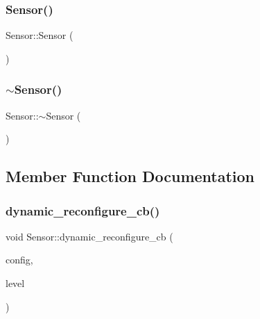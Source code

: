 \subsubsection{\texorpdfstring{Sensor()}{Sensor()}\hspace{0.1cm}{\footnotesize\ttfamily [2/2]}}
{\footnotesize\ttfamily Sensor\+::\+Sensor (\begin{DoxyParamCaption}{ }\end{DoxyParamCaption})}

\mbox{\label{classSensor_aee8c70e7ef05ce65e7ee33686b5d7db2}} 
\subsubsection{\texorpdfstring{$\sim$\+Sensor()}{~Sensor()}\hspace{0.1cm}{\footnotesize\ttfamily [2/2]}}
{\footnotesize\ttfamily Sensor\+::$\sim$\+Sensor (\begin{DoxyParamCaption}{ }\end{DoxyParamCaption})}



\subsection{Member Function Documentation}
\mbox{\label{classSensor_aa95e03d6992d49345dca8c16129dc3c6}} 
\subsubsection{\texorpdfstring{dynamic\+\_\+reconfigure\+\_\+cb()}{dynamic\_reconfigure\_cb()}\hspace{0.1cm}{\footnotesize\ttfamily [1/2]}}
{\footnotesize\ttfamily void Sensor\+::dynamic\+\_\+reconfigure\+\_\+cb (\begin{DoxyParamCaption}\item[{dynamic\+\_\+obstacle\+\_\+tracking\+::velodyne\+Config \&}]{config,  }\item[{uint32\+\_\+t}]{level }\end{DoxyParamCaption})\hspace{0.3cm}{\ttfamily [private]}}

